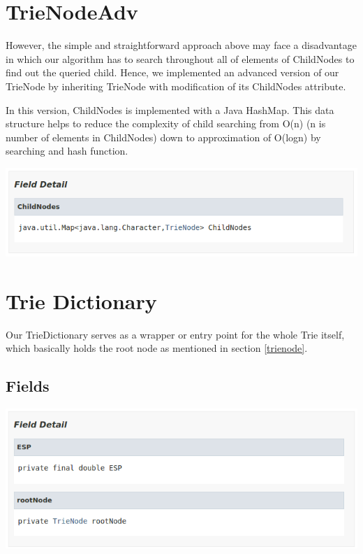 \documentclass[12pt]{article}
\begin{document}
\section{TrieNodeAdv} \label{trienodeadv}

However, the simple and straightforward approach above may face a disadvantage in which our algorithm has to search throughout all of elements of ChildNodes to find out the queried child. Hence, we implemented an advanced version of our TrieNode by inheriting TrieNode with modification of its ChildNodes attribute.

In this version, ChildNodes is implemented with a Java HashMap. This data structure helps to reduce the complexity of child searching from O(n) (n is number of elements in ChildNodes) down to approximation of O(logn) by searching and hash function.

\begin{center}
	\includegraphics[width=\textwidth]{trie_node_adv_fields}
\end{center}

\section{Trie Dictionary}

Our TrieDictionary serves as a wrapper or entry point for the whole Trie itself, which basically holds the root node as mentioned in section \ref{trienode}.

\subsection{Fields}
\begin{center}
	\includegraphics[width=\textwidth]{trie_dictionary_fields}
\end{center}
\end{document}
